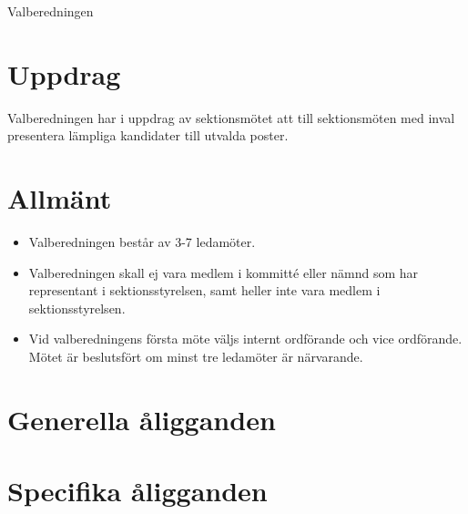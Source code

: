\documentclass[a4paper]{article}
\begin{document}
\renewcommand{\forening}{Valberedningen} %

\begin{foreningenv}{\forening{}} %
    \section{Uppdrag}
    Valberedningen har i uppdrag av sektionsmötet att till sektionsmöten med inval presentera lämpliga kandidater till utvalda poster.
    
    \section{Allmänt}
    \begin{itemize}
        \item Valberedningen består av 3-7 ledamöter.
        \item Valberedningen skall ej vara medlem i kommitté eller nämnd som har representant i sektionsstyrelsen, samt heller inte vara medlem i sektionsstyrelsen.
        \item Vid valberedningens första möte väljs internt ordförande och vice ordförande. Mötet är beslutsfört om minst tre ledamöter är närvarande.
    \end{itemize}
    
    \section{Generella åligganden}
    \aliggsektfunkt{}
    
    \section{Specifika åligganden}

\end{foreningenv}
\end{document}
